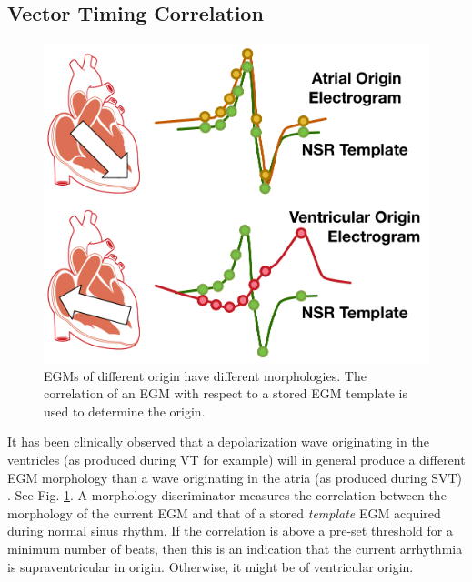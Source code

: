 \subsection{Vector Timing Correlation}
\label{sec:VTC}
\begin{figure}[t]
	\centering
	\vspace{-15pt}
	\includegraphics[scale=0.3]{figures/VTCEGMCompare}
	\caption{\small \acp{EGM} of different origin have different morphologies. The correlation of an \ac{EGM} with respect to a stored \ac{EGM} template is used to determine the origin.}
	\label{fig:egmmorphology}
	\vspace{-10pt}
\end{figure}
It has been clinically observed that a depolarization wave originating in the ventricles (as produced during \ac{VT} for example) will in general produce a different \ac{EGM} morphology than a wave originating in the atria (as produced during \ac{SVT}) \cite{compass}.
See Fig. \ref{fig:egmmorphology}.
%
A morphology discriminator measures the correlation between the morphology of the current \ac{EGM} and that of a stored \emph{template} \ac{EGM} acquired during normal sinus rhythm.
If the correlation is above a pre-set threshold for a minimum number of beats, then this is an indication that the current arrhythmia is supraventricular in origin.
Otherwise, it might be of ventricular origin.


